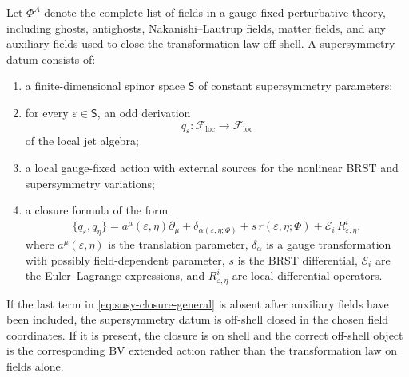 \begin{definition}
\label{def:susy-datum-gauge-fixed}
Let \(\Phi^A\) denote the complete list of fields in a gauge-fixed
perturbative theory, including ghosts, antighosts, Nakanishi--Lautrup fields,
matter fields, and any auxiliary fields used to close the transformation law
off shell.  A supersymmetry datum consists of:
\begin{enumerate}
\item a finite-dimensional spinor space \(\mathsf S\) of constant
supersymmetry parameters;
\item for every \(\varepsilon\in\mathsf S\), an odd derivation
\[
  q_\varepsilon:
  \mathcal F_{\mathrm{loc}}\longrightarrow\mathcal F_{\mathrm{loc}}
\]
of the local jet algebra;
\item a local gauge-fixed action with external sources for the nonlinear
BRST and supersymmetry variations;
\item a closure formula of the form
\begin{equation}
  \{q_\varepsilon,q_\eta\}
  =
  a^\mu(\varepsilon,\eta)\partial_\mu
  +\delta_{\alpha(\varepsilon,\eta;\Phi)}
  +s\,r(\varepsilon,\eta;\Phi)
  +\mathcal E_i\,R^i_{\varepsilon,\eta},
  \label{eq:susy-closure-general}
\end{equation}
where \(a^\mu(\varepsilon,\eta)\) is the translation parameter,
\(\delta_{\alpha}\) is a gauge transformation with possibly field-dependent
parameter, \(s\) is the BRST differential, \(\mathcal E_i\) are the
Euler--Lagrange expressions, and \(R^i_{\varepsilon,\eta}\) are local
differential operators.
\end{enumerate}
If the last term in \eqref{eq:susy-closure-general} is absent after auxiliary
fields have been included, the supersymmetry datum is off-shell closed in the
chosen field coordinates.  If it is present, the closure is on shell and the
correct off-shell object is the corresponding BV extended action rather than
the transformation law on fields alone.
\end{definition}

